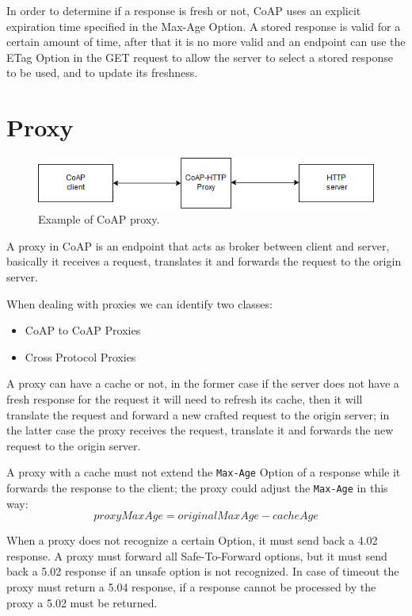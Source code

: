 	In order to determine if a response is fresh or not, CoAP uses an explicit expiration time specified in the Max-Age Option.\newline
	A stored response is valid for a certain amount of time, after that it is no more valid and an endpoint can use the ETag Option in the GET request to allow the server to select a stored response to be used, and to update its freshness.\newline
	
	\section{Proxy}
	
	\begin{figure}
		\includegraphics[width=\linewidth]{coap-img1.png}
		\caption{Example of CoAP proxy.}
		\label{fig:coap1}
	\end{figure}

	A proxy in CoAP is an endpoint that acts as broker between client and server, basically it receives a request, translates it and forwards the request to the origin server.
	
	When dealing with proxies we can identify two classes:
	\begin{itemize}
		\item CoAP to CoAP Proxies
		\item Cross Protocol Proxies
	\end{itemize}
	
	A proxy can have a cache or not, in the former case if the server does not have a fresh response for the request it will need to refresh its cache, then it will translate the request and forward a new crafted request to the origin server; in the latter case the proxy receives the request, translate it and forwards the new request to the origin server.
	
	A proxy with a cache must not extend the \texttt{Max-Age} Option of a response while it forwards the response to the client; the proxy could adjust the \texttt{Max-Age} in this way:
	\begin{equation}
		proxyMaxAge=originalMaxAge-cacheAge
	\end{equation}
	
	When a proxy does not recognize a certain Option, it must send back a 4.02 response.\newline
	A proxy must forward all Safe-To-Forward options, but it must send back a 5.02 response if an unsafe option is not recognized.\newline
	In case of timeout the proxy must return a 5.04 response, if a response cannot be processed by the proxy a 5.02 must be returned.\newline
	
